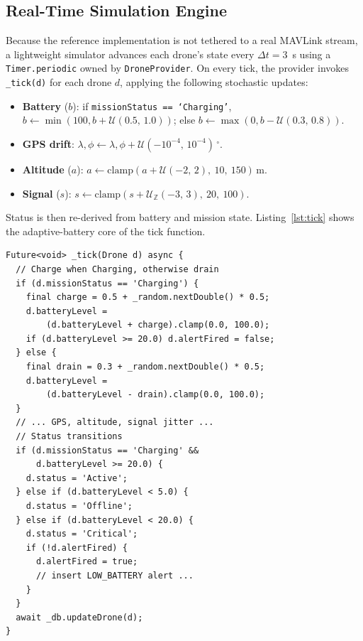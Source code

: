 \documentclass[conference]{IEEEtran}
\begin{document}
\subsection{Real-Time Simulation Engine}

Because the reference implementation is not tethered to a real MAVLink stream, a lightweight simulator advances each drone's state every $\Delta t = 3$~s using a \texttt{Timer.periodic} owned by \texttt{DroneProvider}. On every tick, the provider invokes \texttt{\_tick(d)} for each drone $d$, applying the following stochastic updates:

\begin{itemize}
    \item \textbf{Battery} ($b$): if \texttt{missionStatus == `Charging'}, $b \leftarrow \min(100, b + \mathcal{U}(0.5,\,1.0))$; else $b \leftarrow \max(0, b - \mathcal{U}(0.3,\,0.8))$.
    \item \textbf{GPS drift}: $\lambda, \phi \leftarrow \lambda, \phi + \mathcal{U}(-10^{-4},\,10^{-4})$\,$^{\circ}$.
    \item \textbf{Altitude} ($a$): $a \leftarrow \mathrm{clamp}(a + \mathcal{U}(-2,\,2),\ 10,\ 150)$\,m.
    \item \textbf{Signal} ($s$): $s \leftarrow \mathrm{clamp}(s + \mathcal{U}_{\mathbb{Z}}(-3,\,3),\ 20,\ 100)$.
\end{itemize}

Status is then re-derived from battery and mission state. Listing~\ref{lst:tick} shows the adaptive-battery core of the tick function.

\begin{lstlisting}[caption={Adaptive battery logic in \texttt{DroneProvider.\_tick}.},label={lst:tick}]
Future<void> _tick(Drone d) async {
  // Charge when Charging, otherwise drain
  if (d.missionStatus == 'Charging') {
    final charge = 0.5 + _random.nextDouble() * 0.5;
    d.batteryLevel =
        (d.batteryLevel + charge).clamp(0.0, 100.0);
    if (d.batteryLevel >= 20.0) d.alertFired = false;
  } else {
    final drain = 0.3 + _random.nextDouble() * 0.5;
    d.batteryLevel =
        (d.batteryLevel - drain).clamp(0.0, 100.0);
  }
  // ... GPS, altitude, signal jitter ...
  // Status transitions
  if (d.missionStatus == 'Charging' &&
      d.batteryLevel >= 20.0) {
    d.status = 'Active';
  } else if (d.batteryLevel < 5.0) {
    d.status = 'Offline';
  } else if (d.batteryLevel < 20.0) {
    d.status = 'Critical';
    if (!d.alertFired) {
      d.alertFired = true;
      // insert LOW_BATTERY alert ...
    }
  }
  await _db.updateDrone(d);
}
\end{lstlisting}
\end{document}
